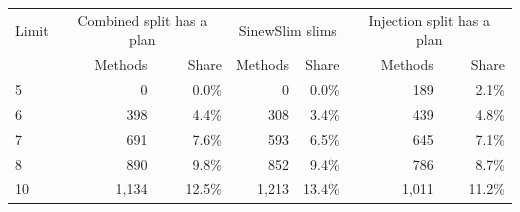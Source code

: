 \begin{tabular}{lrrrrrr}
\toprule
Limit & \multicolumn{2}{c}{Combined split has a plan} & \multicolumn{2}{c}{SinewSlim slims} & \multicolumn{2}{c}{Injection split has a plan} \\
 & Methods & Share & Methods & Share & Methods & Share \\
\midrule
5 & 0 & 0.0\% & 0 & 0.0\% & 189 & 2.1\% \\
6 & 398 & 4.4\% & 308 & 3.4\% & 439 & 4.8\% \\
7 & 691 & 7.6\% & 593 & 6.5\% & 645 & 7.1\% \\
8 & 890 & 9.8\% & 852 & 9.4\% & 786 & 8.7\% \\
10 & 1{,}134 & 12.5\% & 1{,}213 & 13.4\% & 1{,}011 & 11.2\% \\
\bottomrule
\end{tabular}
